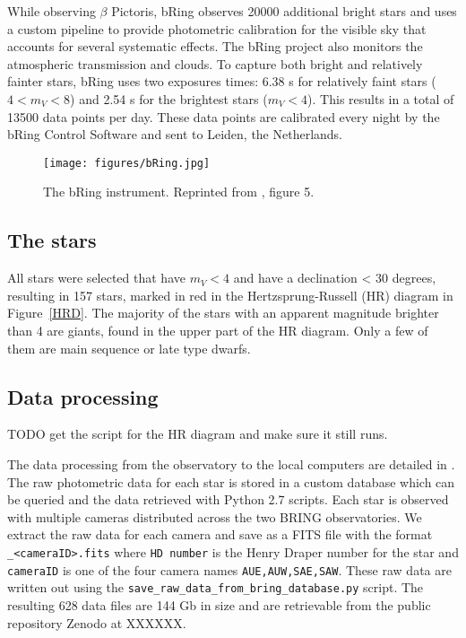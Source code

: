 \documentclass{aa}
\begin{document}
While observing $\beta$ Pictoris, bRing observes 20000 additional bright stars and uses a custom pipeline to provide photometric calibration for the visible sky that accounts for several systematic effects.
%
The bRing project also monitors the atmospheric transmission and clouds.
%
To capture both bright and relatively fainter stars, bRing uses two exposures times: 6.38 s for relatively faint stars ($4 < m_V < 8$) and 2.54 s for the brightest stars ($m_V < 4$). This results in a total of 13500 data points per day.
%
These data points are calibrated every night by the bRing Control Software and sent to Leiden, the Netherlands.

\begin{figure}
    \centering
    \texttt{[image: figures/bRing.jpg]}
    \caption{The bRing instrument. Reprinted from \cite{bring}, figure 5.}
    \label{bRing}
\end{figure}

\subsection{The stars}

All stars were selected that have $m_V<4$ and have a declination < 30 degrees, resulting in 157 stars, marked in red in the Hertzsprung-Russell (HR) diagram in Figure~\ref{HRD}.
%
The majority of the stars with an apparent magnitude brighter than 4 are giants, found in the upper part of the HR diagram.
%
Only a few of them are main sequence or late type dwarfs.


\subsection{Data processing}

TODO get the script for the HR diagram and make sure it still runs.

The data processing from the observatory to the local computers are detailed in \citet{Stuik_2014}.
%
The raw photometric data for each star is stored in a custom database which can be queried and the data retrieved with Python 2.7 scripts.
%
Each star is observed with multiple cameras distributed across the two BRING observatories.
%
We extract the raw data for each camera and save as a FITS file with the format {\tt <HD number>\_<cameraID>.fits} where {\tt HD number} is the Henry Draper number for the star and {\tt cameraID} is one of the four camera names {\tt AUE,AUW,SAE,SAW}.
%
These raw data are written out using the {\tt save\_raw\_data\_from\_bring\_database.py} script.
%
The resulting 628 data files are 144 Gb in size and are retrievable from the public repository Zenodo at XXXXXX.
\end{document}
